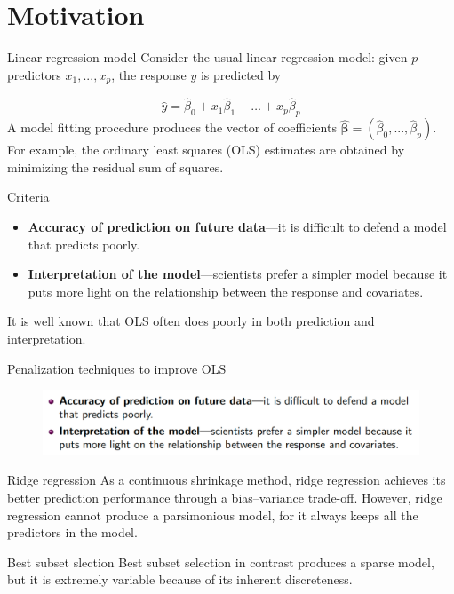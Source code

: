 \section{Motivation}
    \begin{frame}{Linear regression model}
    Consider the usual linear regression model: given $p$ predictors $x_1,..., x_p$, the response $y$ is predicted by
    
    \begin{equation}
\hat{y} = \hat{\beta}_0 + x_1\hat{\beta}_1 + \ldots + x_p\hat{\beta}_p
\end{equation}
\vspace{10pt}
A model fitting procedure produces the vector of coefficients $\hat{\boldsymbol{\beta}}=\left(\hat{\beta}_0,...,\hat{\beta}_p\right)$. For example, the ordinary least squares (OLS) estimates are obtained by minimizing the residual sum of squares.
    \end{frame}

    \begin{frame}{Criteria}
        \begin{itemize}
            \item \textbf{Accuracy of prediction on future data}—it is difficult to defend a model that predicts poorly.
            \item \textbf{Interpretation of the model}—scientists prefer a simpler model because it puts more light on the relationship between the response and covariates.
        \end{itemize}
        \vspace{10pt}
        It is well known that OLS often does poorly in both prediction and interpretation.
\end{frame}

\begin{frame}{Penalization techniques to improve OLS}
    
    \begin{figure}
        \centering
        \includegraphics[width=1\textwidth]{img/image4.png}
    \end{figure}
    
    \begin{block}{Ridge regression}
     As a continuous shrinkage method, ridge regression achieves its better prediction performance through a bias–variance trade-off. However, ridge regression cannot produce a parsimonious model, for it always keeps all the predictors in the model.
    \end{block}
    
     \begin{block}{Best subset slection}
         Best subset selection in contrast produces a sparse model, but it is extremely variable because of its inherent discreteness.
     \end{block}
    \end{frame}

